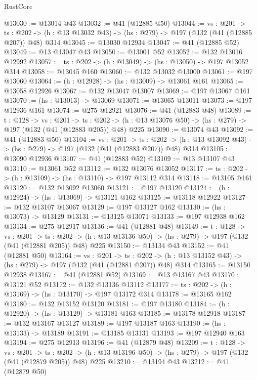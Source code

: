\begin{lexlean}{RustCore}
\begin{coremodule}
@13030 := @13014 @43
@13032 := @41 (@12885 @50)
@13044 := {vs : @201} ->
  {ts : @202} -> (h : @13 @13032 @43) -> (hs : @279) -> @197 (@132 (@41 (@12885 @207)) @48) @314
@13045 := @13030 @12934
@13047 := @41 (@12885 @52)
@13049 := @13 @13047 @43
@13050 := @13001 @52
@13052 := @132 @13016 @12992
@13057 := {ts : @202} -> (h : @13049) -> (hs : @13050) -> @197 @13052 @314
@13058 := @13045 @160
@13060 := @132 @13032 @13000
@13061 := @197 @13060
@13064 := (h : @12928) -> (hs : @13009) -> @13061 @161
@13065 := @13058 @12926
@13067 := @132 @13047 @13007
@13069 := @197 @13067 @161
@13070 := (hs : @13013) -> @13069
@13071 := @13065 @13011
@13073 := @197 @12936 @161
@13074 := @275 @12921
@13076 := @41 (@12883 @48)
@13089 := {t : @128} ->
  {vs : @201} ->
  {ts : @202} -> (h : @13 @13076 @50) -> (hs : @279) -> @197 (@132 (@41 (@12883 @205)) @48) @225
@13090 := @13074 @43
@13092 := @41 (@12883 @50)
@13104 := {vs : @201} ->
  {ts : @202} -> (h : @13 @13092 @43) -> (hs : @279) -> @197 (@132 (@41 (@12883 @207)) @48) @314
@13105 := @13090 @12936
@13107 := @41 (@12883 @52)
@13109 := @13 @13107 @43
@13110 := @13061 @52
@13112 := @132 @13076 @13052
@13117 := {ts : @202} -> (h : @13109) -> (hs : @13110) -> @197 @13112 @314
@13118 := @13105 @161
@13120 := @132 @13092 @13060
@13121 := @197 @13120
@13124 := (h : @12924) -> (hs : @13069) -> @13121 @162
@13125 := @13118 @12922
@13127 := @132 @13107 @13067
@13129 := @197 @13127 @162
@13130 := (hs : @13073) -> @13129
@13131 := @13125 @13071
@13133 := @197 @12938 @162
@13134 := @275 @12917
@13136 := @41 (@12881 @48)
@13149 := {t : @128} ->
  {vs : @201} ->
  {ts : @202} -> (h : @13 @13136 @50) -> (hs : @279) -> @197 (@132 (@41 (@12881 @205)) @48) @225
@13150 := @13134 @43
@13152 := @41 (@12881 @50)
@13164 := {vs : @201} ->
  {ts : @202} -> (h : @13 @13152 @43) -> (hs : @279) -> @197 (@132 (@41 (@12881 @207)) @48) @314
@13165 := @13150 @12938
@13167 := @41 (@12881 @52)
@13169 := @13 @13167 @43
@13170 := @13121 @52
@13172 := @132 @13136 @13112
@13177 := {ts : @202} -> (h : @13169) -> (hs : @13170) -> @197 @13172 @314
@13178 := @13165 @162
@13180 := @132 @13152 @13120
@13181 := @197 @13180
@13184 := (h : @12920) -> (hs : @13129) -> @13181 @163
@13185 := @13178 @12918
@13187 := @132 @13167 @13127
@13189 := @197 @13187 @163
@13190 := (hs : @13133) -> @13189
@13191 := @13185 @13131
@13193 := @197 @12940 @163
@13194 := @275 @12913
@13196 := @41 (@12879 @48)
@13209 := {t : @128} ->
  {vs : @201} ->
  {ts : @202} -> (h : @13 @13196 @50) -> (hs : @279) -> @197 (@132 (@41 (@12879 @205)) @48) @225
@13210 := @13194 @43
@13212 := @41 (@12879 @50)

\end{coremodule}
\end{lexlean}
